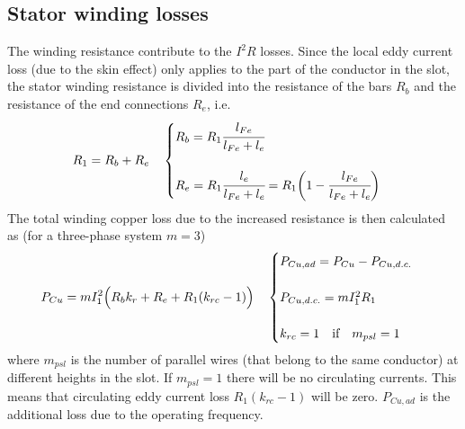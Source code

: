 \subsection{Stator winding losses}
The winding resistance contribute to the $I^2 R$ losses. Since the local eddy current loss (due to the skin effect) only applies to the part of the conductor in the slot, the stator winding resistance is divided into the resistance of the bars $R_b$ and the resistance of the end connections $R_e$, i.e.
\begin{equation}
  \label{eqn:R1b}
  R_1 = R_b+R_e
  \quad
  \begin{cases} 
  R_b = R_1\cfrac{l_{Fe}}{l_{Fe}+l_e} \\
  \:\\
  R_e = R_1\cfrac{l_e}{l_{Fe}+l_e} 
      = R_1\biggl(1-\cfrac{l_{Fe}}{l_{Fe}+l_e}\biggr)
  \end{cases}
\end{equation}
The total winding copper loss due to the increased resistance is then calculated as (for a three-phase system $m=3$)
\begin{equation}
  \label{eqn_PCu_kr_rkc}
  P_{Cu} = mI_{1}^{2}\Bigl(R_b k_r + R_e + R_1 (k_{rc}-1)\Bigr)
  \quad
  \begin{cases}
    P_{Cu,ad}   = P_{Cu}-P_{Cu,d.c.} \\
    \:\\
    P_{Cu,d.c.} = mI_{1}^{2} R_1 \\
    \:\\
    k_{rc}=1 \quad \mbox{if} \quad m_{psl} = 1
  \end{cases} 
\end{equation} 
where $m_{psl}$ is the number of parallel wires (that belong to the same conductor) at different heights in the slot. If $m_{psl}=1$ there will be no circulating currents. This means that circulating eddy current loss $R_1 (k_{rc}-1)$ will be zero. $P_{Cu,ad}$ is the additional loss due to the operating frequency.  

